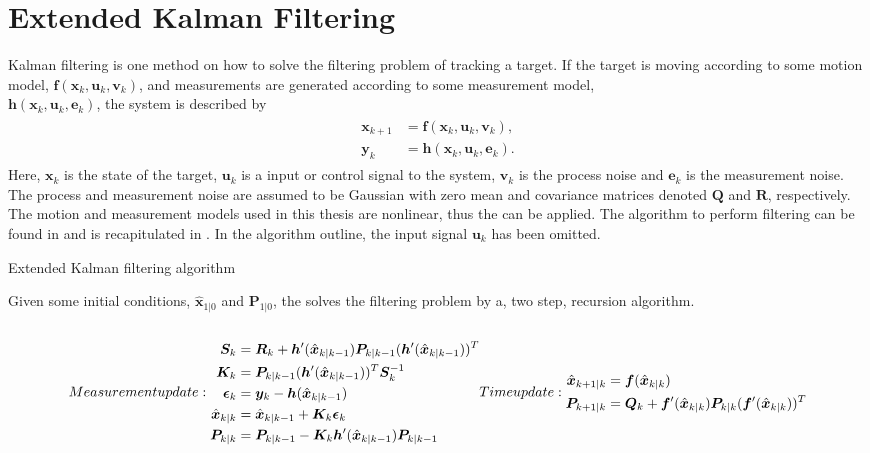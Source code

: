 \newpage

\section{Extended Kalman Filtering}
Kalman filtering \cite{Gustafsson:2012} is one method on how to solve the filtering problem of tracking a target.
If the target is moving according to some motion model, $\bm{f}(\bm{x}_k,\bm{u}_k,\bm{v}_k)$, and measurements are generated according to some measurement model, \\ $\bm{h}(\bm{x}_k,\bm{u}_k,\bm{e}_k)$, the system is described by
\begin{align}
\begin{split}
	\bm{x}_{k+1} &= \bm{f}(\bm{x}_k,\bm{u}_k,\bm{v}_k), \\
	\bm{y}_k &= \bm{h}(\bm{x}_k,\bm{u}_k,\bm{e}_k).
\end{split}
\end{align}
Here, $\bm{x}_k$ is the state of the target, $\bm{u}_k$ is a input or control signal to the system, $\bm{v}_k$ is the process noise and $\bm{e}_k$ is the measurement noise.
The process and measurement noise are assumed to be Gaussian with zero mean and covariance matrices denoted $\bm{Q}$ and $\bm{R}$, respectively.
The motion and measurement models used in this thesis are nonlinear, thus the \abbrEKF can be applied.
The algorithm to perform \abbrEKF filtering can be found in \cite{Gustafsson:2012} and is recapitulated in .
In the algorithm outline, the input signal $\bm{u}_k$ has been omitted.

\begin{algorithm}
	\caption{\label{algo:ekf} Extended Kalman filtering algorithm}
	Given some initial conditions, $\hat{\bm{x}}_{1|0}$ and $\bm{P}_{1|0}$, the \abbrEKF solves the filtering problem by a, two step, recursion algorithm. \\ \\
	\begin{subequations}
	Measurement update:
	\begin{align}
		\bm{S}_k &= \bm{R}_k + \bm{h}^\prime(\hat{\bm{x}}_ {k|k-1}) \bm{P}_{k|k-1} (\bm{h}^\prime(\hat{\bm{x}}_ {k|k-1}))^T \\
		\bm{K}_k &= \bm{P}_{k|k-1} (\bm{h}^\prime(\hat{\bm{x}}_ {k|k-1}))^T \bm{S}_k^{-1} \\
		\bm{\epsilon}_k &= \bm{y}_k - \bm{h}(\hat{\bm{x}}_{k|k-1}) \\
		\hat{\bm{x}}_{k|k} &= \hat{\bm{x}}_{k|k-1} + \bm{K}_k \bm{\epsilon}_k \\
		\bm{P}_{k|k} &= \bm{P}_{k|k-1} - \bm{K}_k \bm{h}^\prime(\hat{\bm{x}}_{k|k-1}) \bm{P}_{k|k-1}
	\end{align}
	\\
	Time update:
	\begin{align}
		\hat{\bm{x}}_{k+1|k} &= \bm{f}(\hat{\bm{x}}_{k|k}) \\
		\bm{P}_{k+1|k} &= \bm{Q}_k + \bm{f}^\prime(\hat{\bm{x}}_{k|k}) \bm{P}_{k|k} (\bm{f}^\prime(\hat{\bm{x}}_{k|k}))^T
	\end{align}
	\end{subequations}
\end{algorithm}

